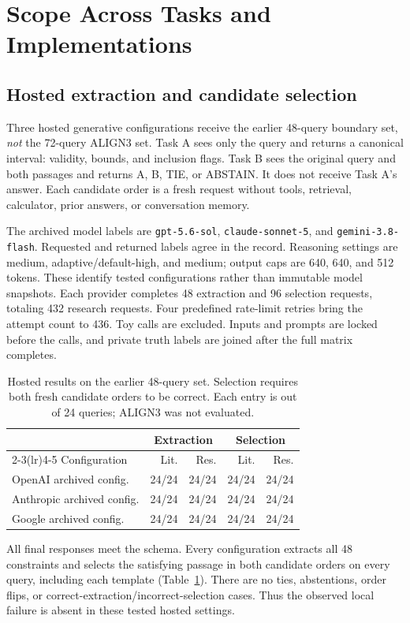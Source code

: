 \documentclass[conference,letterpaper]{IEEEtran}
\begin{document}
\section{Scope Across Tasks and Implementations}\label{sec:scope}
\subsection{Hosted extraction and candidate selection}
Three hosted generative configurations receive the earlier 48-query boundary set, \emph{not} the 72-query ALIGN3 set. Task A sees only the query and returns a canonical interval: validity, bounds, and inclusion flags. Task B sees the original query and both passages and returns A, B, TIE, or ABSTAIN. It does not receive Task A's answer. Each candidate order is a fresh request without tools, retrieval, calculator, prior answers, or conversation memory.

The archived model labels are \texttt{gpt-5.6-sol}, \texttt{claude-sonnet-5}, and \texttt{gemini-3.8-flash}. Requested and returned labels agree in the record. Reasoning settings are medium, adaptive/default-high, and medium; output caps are 640, 640, and 512 tokens. These identify tested configurations rather than immutable model snapshots. Each provider completes 48 extraction and 96 selection requests, totaling 432 research requests. Four predefined rate-limit retries bring the attempt count to 436. Toy calls are excluded. Inputs and prompts are locked before the calls, and private truth labels are joined after the full matrix completes.
\begin{table}[t]
\caption{Hosted results on the earlier 48-query set. Selection requires both fresh candidate orders to be correct. Each entry is out of 24 queries; ALIGN3 was not evaluated.}
\label{tab:hosted}
\centering\footnotesize
\begin{tabular}{lrrrr}
\toprule
& \multicolumn{2}{c}{Extraction} & \multicolumn{2}{c}{Selection} \\
\cmidrule(lr){2-3}\cmidrule(lr){4-5}
Configuration & Lit. & Res. & Lit. & Res. \\
\midrule
OpenAI archived config. & 24/24 & 24/24 & 24/24 & 24/24 \\
Anthropic archived config. & 24/24 & 24/24 & 24/24 & 24/24 \\
Google archived config. & 24/24 & 24/24 & 24/24 & 24/24 \\
\bottomrule
\end{tabular}
\end{table}
All final responses meet the schema. Every configuration extracts all 48 constraints and selects the satisfying passage in both candidate orders on every query, including each template (Table~\ref{tab:hosted}). There are no ties, abstentions, order flips, or correct-extraction/incorrect-selection cases. Thus the observed local failure is absent in these tested hosted settings.
\end{document}
